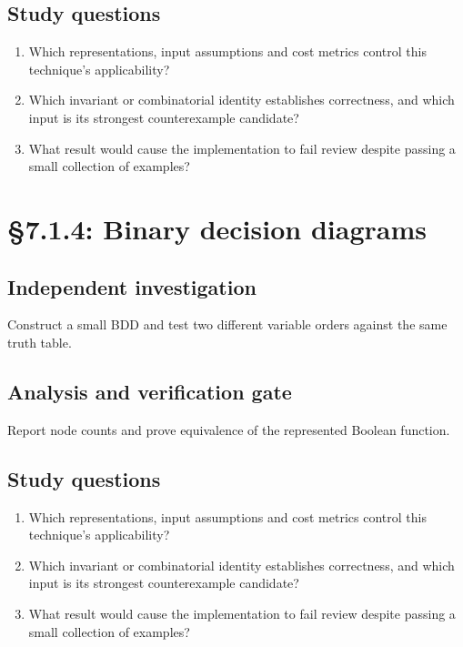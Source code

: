 \documentclass[11pt,letterpaper]{article}
\begin{document}
\subsection{Study questions}
\begin{enumerate}
\item Which representations, input assumptions and cost metrics control this technique's applicability?
\item Which invariant or combinatorial identity establishes correctness, and which input is its strongest counterexample candidate?
\item What result would cause the implementation to fail review despite passing a small collection of examples?
\end{enumerate}

\section{\S 7.1.4: Binary decision diagrams}
\subsection{Independent investigation}
Construct a small BDD and test two different variable orders against the same truth table.
\subsection{Analysis and verification gate}
Report node counts and prove equivalence of the represented Boolean function.
\subsection{Study questions}
\begin{enumerate}
\item Which representations, input assumptions and cost metrics control this technique's applicability?
\item Which invariant or combinatorial identity establishes correctness, and which input is its strongest counterexample candidate?
\item What result would cause the implementation to fail review despite passing a small collection of examples?
\end{enumerate}
\end{document}
